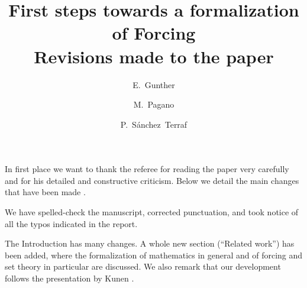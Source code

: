 \documentclass[12pt,english]{article}
\begin{document}
\title{First steps towards a formalization of Forcing
  \\ Revisions made to the paper}
\author{E.~Gunther \and  M.~Pagano \and P.~S\'anchez~Terraf
}
\date{}
\maketitle

In first place we want to thank the referee for reading the paper very
carefully and for his detailed and constructive criticism. Below we
detail the main changes that have been made%
.

We have spelled-check the manuscript, corrected punctuation, and took
notice of all the typos indicated in the report. 

The Introduction has many changes. A whole new section (``Related
work'') has been added, where the formalization of mathematics in
general and of forcing and set theory in particular are discussed.
We also remark that our  development follows the
presentation by Kunen \cite{kunen2011set}.



%
%


\end{document}

